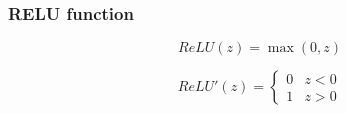 \subsubsection{RELU function}

\begin{equation}
    ReLU(z) = \max(0, z)
    \label{eq : ReLU}
\end{equation}

\begin{equation}
    ReLU'(z) = \begin{cases}
        0 & z < 0 \\
        1 & z > 0
    \end{cases}
    \label{eq : ReLUPrime}
\end{equation}
\cite[p.~214-242]{LectureNotes}


